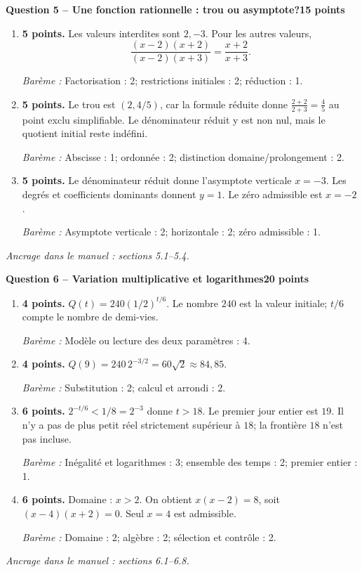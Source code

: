 \documentclass[11pt,a4paper]{article}
\begin{document}
\newpage
{\large\bfseries Question 5 -- Une fonction rationnelle : trou ou asymptote?}\hfill\textbf{15 points}\par
\begin{enumerate}
\item \textbf{5 points.} Les valeurs interdites sont \(2,-3\). Pour les autres valeurs, \[\frac{(x-2)(x+2)}{(x-2)(x+3)}=\frac{x+2}{x+3}.\]
\par{\small\textit{Barème : }Factorisation : 2; restrictions initiales : 2; réduction : 1.}
\item \textbf{5 points.} Le trou est \((2,4/5)\), car la formule réduite donne \(\frac{2+2}{2+3}=\frac45\) au point exclu simplifiable. Le dénominateur réduit y est non nul, mais le quotient initial reste indéfini.
\par{\small\textit{Barème : }Abscisse : 1; ordonnée : 2; distinction domaine/prolongement : 2.}
\item \textbf{5 points.} Le dénominateur réduit donne l’asymptote verticale \(x=-3\). Les degrés et coefficients dominants donnent \(y=1\). Le zéro admissible est \(x=-2\).
\par{\small\textit{Barème : }Asymptote verticale : 2; horizontale : 2; zéro admissible : 1.}
\end{enumerate}
\vfill {\small\textit{Ancrage dans le manuel : sections 5.1--5.4.}}

\newpage
{\large\bfseries Question 6 -- Variation multiplicative et logarithmes}\hfill\textbf{20 points}\par
\begin{enumerate}
\item \textbf{4 points.} \(Q(t)=240(1/2)^{t/6}\). Le nombre \(240\) est la valeur initiale; \(t/6\) compte le nombre de demi-vies.
\par{\small\textit{Barème : }Modèle ou lecture des deux paramètres : 4.}
\item \textbf{4 points.} \(Q(9)=240\,2^{-3/2}=60\sqrt2\approx84{,}85\).
\par{\small\textit{Barème : }Substitution : 2; calcul et arrondi : 2.}
\item \textbf{6 points.} \(2^{-t/6}<1/8=2^{-3}\) donne \(t>18\). Le premier jour entier est \(19\). Il n’y a pas de plus petit réel strictement supérieur à \(18\); la frontière \(18\) n’est pas incluse.
\par{\small\textit{Barème : }Inégalité et logarithmes : 3; ensemble des temps : 2; premier entier : 1.}
\item \textbf{6 points.} Domaine : \(x>2\). On obtient \(x(x-2)=8\), soit \((x-4)(x+2)=0\). Seul \(x=4\) est admissible.
\par{\small\textit{Barème : }Domaine : 2; algèbre : 2; sélection et contrôle : 2.}
\end{enumerate}
\vfill {\small\textit{Ancrage dans le manuel : sections 6.1--6.8.}}
\end{document}
